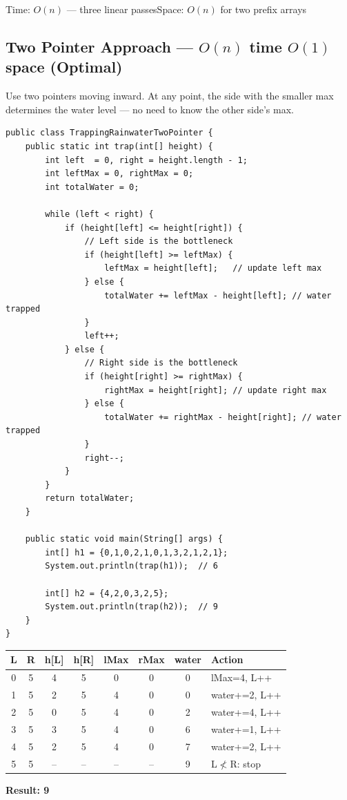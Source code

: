 \documentclass[12pt,a4paper,oneside]{book}
\begin{document}
\begin{complexity}
Time: $O(n)$ --- three linear passes\quad Space: $O(n)$ for two prefix arrays
\end{complexity}

\subsection{Two Pointer Approach --- $O(n)$ time $O(1)$ space (Optimal)}

Use two pointers moving inward. At any point, the side with the smaller max determines the water level --- no need to know the other side's max.

\begin{lstlisting}[caption={Trapping Rainwater --- Two Pointer O(n) time O(1) space}]
public class TrappingRainwaterTwoPointer {
    public static int trap(int[] height) {
        int left  = 0, right = height.length - 1;
        int leftMax = 0, rightMax = 0;
        int totalWater = 0;

        while (left < right) {
            if (height[left] <= height[right]) {
                // Left side is the bottleneck
                if (height[left] >= leftMax) {
                    leftMax = height[left];   // update left max
                } else {
                    totalWater += leftMax - height[left]; // water trapped
                }
                left++;
            } else {
                // Right side is the bottleneck
                if (height[right] >= rightMax) {
                    rightMax = height[right]; // update right max
                } else {
                    totalWater += rightMax - height[right]; // water trapped
                }
                right--;
            }
        }
        return totalWater;
    }

    public static void main(String[] args) {
        int[] h1 = {0,1,0,2,1,0,1,3,2,1,2,1};
        System.out.println(trap(h1));  // 6

        int[] h2 = {4,2,0,3,2,5};
        System.out.println(trap(h2));  // 9
    }
}
\end{lstlisting}

\begin{dryrun}[height = \{4, 2, 0, 3, 2, 5\}]
\begin{center}
\begin{tabular}{cccccccp{3cm}}
\toprule
\textbf{L} & \textbf{R} & \textbf{h[L]} & \textbf{h[R]} & \textbf{lMax} & \textbf{rMax} & \textbf{water} & \textbf{Action}\\
\midrule
0 & 5 & 4 & 5 & 0 & 0 & 0 & lMax=4, L++\\
1 & 5 & 2 & 5 & 4 & 0 & 0 & water+=2, L++\\
2 & 5 & 0 & 5 & 4 & 0 & 2 & water+=4, L++\\
3 & 5 & 3 & 5 & 4 & 0 & 6 & water+=1, L++\\
4 & 5 & 2 & 5 & 4 & 0 & 7 & water+=2, L++\\
5 & 5 & -- & -- & -- & -- & 9 & L$\not<$R: stop\\
\bottomrule
\end{tabular}
\end{center}
\textbf{Result: 9}
\end{dryrun}
\end{document}
